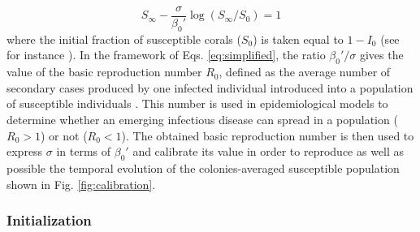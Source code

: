 \documentclass[utf8]{frontiersSCNS}
\begin{document}
\begin{equation}
    S_\infty - \frac{\sigma}{\beta_0'}\log(S_{\infty}/S_0) = 1\label{eq:ratio}
\end{equation}
where the initial fraction of susceptible corals ($S_0$) is taken equal to $1-I_0$ (see for instance \cite{Murray07}). In the framework of Eqs. \ref{eq:simplified}, the ratio $\beta_0'/\sigma$ gives the value of the basic reproduction number $R_0$, defined as the average number of secondary cases produced by one infected individual introduced into a population of susceptible individuals \citep{keeling2007stochastic}. This number is used in epidemiological models to determine whether an emerging infectious disease can spread in a population ($R_0 > 1$) or not ($R_0 < 1$). The obtained basic reproduction number is then used to express $\sigma$ in terms of $\beta_0'$ and calibrate its value in order to reproduce as well as possible the temporal evolution of the colonies-averaged susceptible population shown in Fig. \ref{fig:calibration}.

\subsubsection{Initialization} \label{sec:init}
\end{document}
